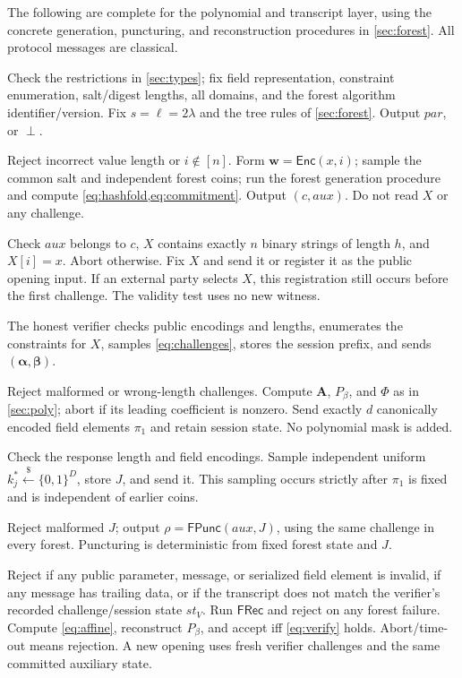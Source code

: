 \documentclass[11pt]{article}
\theoremstyle{plain}
\theoremstyle{definition}
\theoremstyle{remark}
\newcommand{\bits}{\{0,1\}}
\newcommand{\getsr}{\mathrel{\overset{\$}{\leftarrow}}}
\newcommand{\bad}{\perp}
\newcommand{\Enc}{\mathsf{Enc}}
\newcommand{\Punc}{\mathsf{FPunc}}
\newcommand{\Rec}{\mathsf{FRec}}
\begin{document}
The following are complete for the polynomial and transcript layer, using the concrete generation, puncturing, and reconstruction procedures
in \cref{sec:forest}.
All protocol messages are classical.
\begin{description}[style=nextline]
\item[$\mathsf{Setup}(1^\lambda,h,n,\kappa,D,\tau,\mathsf{mode})$.]
Check the restrictions in \cref{sec:types}; fix field representation,
constraint enumeration, salt/digest lengths, all domains, and the forest
algorithm identifier/version. Fix $s=\ell=2\lambda$ and the tree rules
of \cref{sec:forest}. Output $par$, or $\bad$.
\item[$\mathsf{Commit}(par,x,i)$.]
Reject incorrect value length or $i\notin[n]$. Form $\mathbf w=\Enc(x,i)$;
sample the common salt and independent forest coins; run the forest
generation procedure and compute \cref{eq:hashfold,eq:commitment}.
Output $(c,aux)$. Do not read $X$ or any challenge.
\item[$\mathsf{OpenStart}(par,c,aux,X)$.]
Check $aux$ belongs to $c$, $X$ contains exactly $n$ binary strings of length
$h$, and $X[i]=x$. Abort otherwise. Fix $X$ and send it or register it as
the public opening input. If an external party selects $X$, this registration
still occurs before the first challenge. The validity test uses no new witness.
\item[$\mathsf{Challenge}_1(par,c,X)$.]
The honest verifier checks public encodings and lengths, enumerates the
constraints for $X$, samples \cref{eq:challenges}, stores the session prefix,
and sends $(\boldsymbol\alpha,\boldsymbol\beta)$.
\item[$\mathsf{Respond}_1(par,aux,X,\boldsymbol\alpha,\boldsymbol\beta)$.]
Reject malformed or wrong-length challenges. Compute $\mathbf A$, $P_\beta$,
and $\Phi$ as in \cref{sec:poly}; abort if its leading coefficient is nonzero.
Send exactly $d$ canonically encoded field elements $\pi_1$ and retain session
state. No polynomial mask is added.
\item[$\mathsf{Challenge}_2(par,c,X,\boldsymbol\alpha,\boldsymbol\beta,\pi_1)$.]
Check the response length and field encodings. Sample independent uniform
$k_j^*\getsr\bits^D$, store $J$, and send it. This sampling occurs strictly
after $\pi_1$ is fixed and is independent of earlier coins.
\item[$\mathsf{Respond}_2(par,aux,J)$.]
Reject malformed $J$; output $\rho=\Punc(aux,J)$, using the same challenge
in every forest. Puncturing is deterministic from fixed forest state and $J$.
\item[$\mathsf{VerifySession}(par,c,X,\boldsymbol\alpha,
\boldsymbol\beta,\pi_1,J,\rho;st_V)$.]
Reject if any public parameter, message, or serialized field element is
invalid, if any message has trailing data, or if the transcript does not
match the verifier's recorded challenge/session state $st_V$.
Run $\Rec$ and reject on any forest failure. Compute \cref{eq:affine},
reconstruct $P_\beta$, and accept iff \cref{eq:verify} holds. Abort/time-out
means rejection. A new opening uses fresh verifier challenges and the same
committed auxiliary state.
\end{description}
\end{document}
